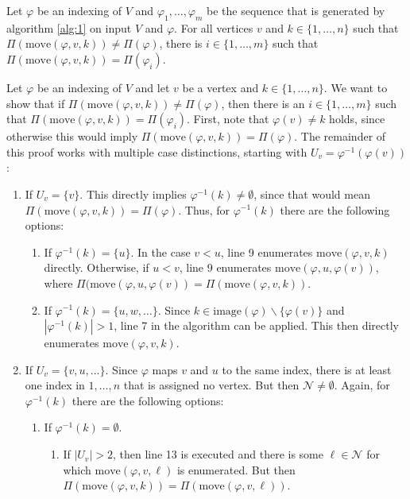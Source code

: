 \documentclass[11pt,a4paper]{article}
\numberwithin{equation}{section}
\newcommand{\idx}{\varphi}
\newcommand{\move}{\mathrm{move}}
\newcommand{\image}{\mathrm{image}}
\begin{document}
\begin{lemmarep}[Completeness]
    Let $\idx$ be an indexing of $V$ and $\idx_1,\dots,\idx_m$ be the sequence that is generated by algorithm \ref{alg:1} on input $V$ and $\idx$. For all vertices $v$ and $k \in \{1,\dots,n\}$ such that $\Pi(\move(\idx,v,k)) \neq \Pi(\idx)$, there is $i\in \{1,\dots,m\}$ such that $\Pi(\move(\idx,v,k)) = \Pi(\idx_i)$.\label{lemma:completeness}
\end{lemmarep}
\begin{appendixproof}
    Let $\idx$ be an indexing of $V$ and let $v$ be a vertex and $k\in\{1,\dots,n\}$. We want to show that if $\Pi(\move(\idx,v,k)) \neq \Pi(\idx)$, then there is an $i\in \{1,\dots,m\}$ such that $\Pi(\move(\idx,v,k)) = \Pi(\idx_i)$. First, note that $\idx(v)\neq k$ holds, since otherwise this would imply $\Pi(\move(\idx,v,k)) = \Pi(\idx)$. The remainder of this proof works with multiple case distinctions, starting with $U_v=\idx^{-1}(\idx(v))$:
    \begin{enumerate}
        \item If $U_v = \{ v \}$. This directly implies $\idx^{-1}(k) \neq \emptyset$, since that would mean $\Pi(\move(\idx,v,k)) = \Pi(\idx)$. Thus, for $\idx^{-1}(k)$ there are the following options:
        \begin{enumerate}
            \item If $\idx^{-1}(k) = \{ u \}$. In the case $v < u$, line 9 enumerates $\move(\idx,v,k)$ directly.  Otherwise, if $u < v$, line 9 enumerates $\move(\idx,u,\idx(v))$, where $\Pi(\move(\idx,u,\idx(v)) = \Pi(\move(\idx,v,k))$. 
            \item If $\idx^{-1}(k) = \{ u,w,\dots \}$. Since $k \in \image(\idx)\backslash \{\idx(v)\}$ and $|\idx^{-1}(k)|>1$, line 7 in the algorithm can be applied. This then directly enumerates $\move(\idx,v,k)$.
        \end{enumerate} 
        \item If $U_v = \{ v,u, \dots \}$. Since $\idx$ maps $v$ and $u$ to the same index, there is at least one index in $1,\dots,n$ that is assigned no vertex. But then $\mathcal{N} \neq \emptyset$. Again, for $\idx^{-1}(k)$ there are the following options:
        \begin{enumerate}
            \item If $\idx^{-1}(k) = \emptyset$. 
            \begin{enumerate}
                \item If $|U_v| >2$, then line 13 is executed and there is some $\ell \in \mathcal{N}$ for which $\move(\idx,v,\ell)$ is enumerated. But then $\Pi(\move(\idx,v,k))=\Pi(\move(\idx,v,\ell))$.

\end{enumerate}
\end{enumerate}
\end{enumerate}
\end{appendixproof}
\end{document}
